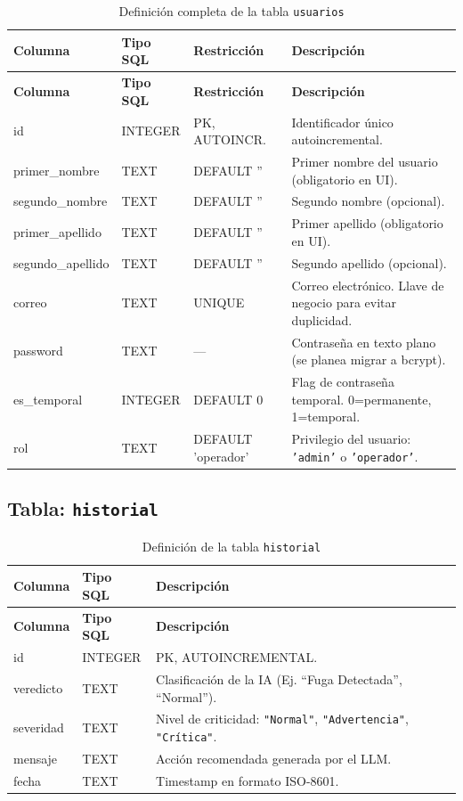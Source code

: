\documentclass[12pt,a4paper]{article}
\begin{document}
\begin{longtable}{>{\ttfamily}p{3.8cm} p{2.5cm} p{2cm} p{5.2cm}}
\caption{Definición completa de la tabla \texttt{usuarios}} \label{tab:tabla-usuarios} \\
\toprule
\textbf{Columna} & \textbf{Tipo SQL} & \textbf{Restricción} & \textbf{Descripción} \\
\midrule
\endfirsthead
\toprule
\textbf{Columna} & \textbf{Tipo SQL} & \textbf{Restricción} & \textbf{Descripción} \\
\midrule
\endhead
\bottomrule
\endlastfoot
id              & INTEGER & PK, AUTOINCR. & Identificador único autoincremental. \\[0.3em]
primer\_nombre  & TEXT    & DEFAULT ''    & Primer nombre del usuario (obligatorio en UI). \\[0.3em]
segundo\_nombre & TEXT    & DEFAULT ''    & Segundo nombre (opcional). \\[0.3em]
primer\_apellido& TEXT    & DEFAULT ''    & Primer apellido (obligatorio en UI). \\[0.3em]
segundo\_apellido& TEXT   & DEFAULT ''    & Segundo apellido (opcional). \\[0.3em]
correo          & TEXT    & UNIQUE        & Correo electrónico. Llave de negocio para evitar duplicidad. \\[0.3em]
password        & TEXT    & ---           & Contraseña en texto plano (se planea migrar a bcrypt). \\[0.3em]
es\_temporal    & INTEGER & DEFAULT 0     & Flag de contraseña temporal. 0=permanente, 1=temporal. \\[0.3em]
rol             & TEXT    & DEFAULT 'operador' & Privilegio del usuario: \texttt{'admin'} o \texttt{'operador'}. \\
\end{longtable}

\subsection{Tabla: \texttt{historial}}

\begin{longtable}{>{\ttfamily}p{3cm} p{3cm} p{7.5cm}}
\caption{Definición de la tabla \texttt{historial}} \label{tab:tabla-historial} \\
\toprule
\textbf{Columna} & \textbf{Tipo SQL} & \textbf{Descripción} \\
\midrule
\endfirsthead
\toprule
\textbf{Columna} & \textbf{Tipo SQL} & \textbf{Descripción} \\
\midrule
\endhead
\bottomrule
\endlastfoot
id        & INTEGER & PK, AUTOINCREMENTAL. \\
veredicto & TEXT    & Clasificación de la IA (Ej. ``Fuga Detectada'', ``Normal''). \\
severidad & TEXT    & Nivel de criticidad: \texttt{"Normal"}, \texttt{"Advertencia"}, \texttt{"Crítica"}. \\
mensaje   & TEXT    & Acción recomendada generada por el LLM. \\
fecha     & TEXT    & Timestamp en formato ISO-8601. \\
\end{longtable}
\end{document}
